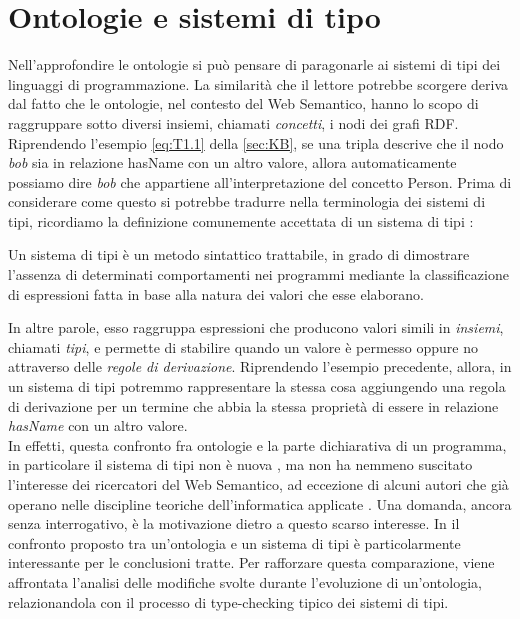 \section{Ontologie e sistemi di tipo}
Nell'approfondire le ontologie si può pensare di paragonarle ai sistemi di tipi dei linguaggi di programmazione. La similarità che il lettore potrebbe scorgere deriva dal fatto che le ontologie, nel contesto del Web Semantico, hanno lo scopo di raggruppare sotto diversi insiemi, chiamati \textit{concetti}, i nodi dei grafi RDF. Riprendendo l'esempio \eqref{eq:T1.1} della \autoref{sec:KB}, se una tripla descrive che il nodo \textsl{bob} sia in relazione hasName con un altro valore, allora automaticamente possiamo dire \textsl{bob} che appartiene all'interpretazione del concetto Person. Prima di considerare come questo si potrebbe tradurre nella terminologia dei sistemi di tipi, ricordiamo la definizione comunemente accettata di un sistema di tipi \cite{pierceTypesBook}:
\begin{definition}
	Un sistema di tipi è un metodo sintattico trattabile, in grado di dimostrare l'assenza di determinati comportamenti nei programmi mediante la classificazione di espressioni fatta in base alla natura dei valori che esse elaborano.
\end{definition}
\noindent
In altre parole, esso raggruppa espressioni che producono valori simili in \textit{insiemi}, chiamati \textit{tipi}, e permette di stabilire quando un valore è permesso oppure no attraverso delle \textsl{regole di derivazione}. Riprendendo l'esempio precedente, allora, in un sistema di tipi potremmo rappresentare la stessa cosa aggiungendo una regola di derivazione per un termine che abbia la stessa proprietà di essere in relazione \textsl{hasName} con un altro valore.\\
In effetti, questa confronto fra ontologie e la parte dichiarativa di un programma, in particolare il sistema di tipi non è nuova \cite{moten2015SWTypeSystem, despeyroux2008evolution}, ma non ha nemmeno suscitato l'interesse dei ricercatori del Web Semantico, ad eccezione di alcuni autori che già operano nelle discipline teoriche dell'informatica applicate \cite{dapoigny2011typetheoryKR, leinbergerphdthesis, ciobanu2016typeFoundationforRDFS}. Una domanda, ancora senza interrogativo, è la motivazione dietro a questo scarso interesse.
In \cite{despeyroux2008evolution} il confronto proposto tra un'ontologia e un sistema di tipi è particolarmente interessante per le conclusioni tratte. Per rafforzare questa comparazione, viene affrontata l'analisi delle modifiche svolte durante l'evoluzione di un'ontologia, relazionandola con il processo di type-checking tipico dei sistemi di tipi.

